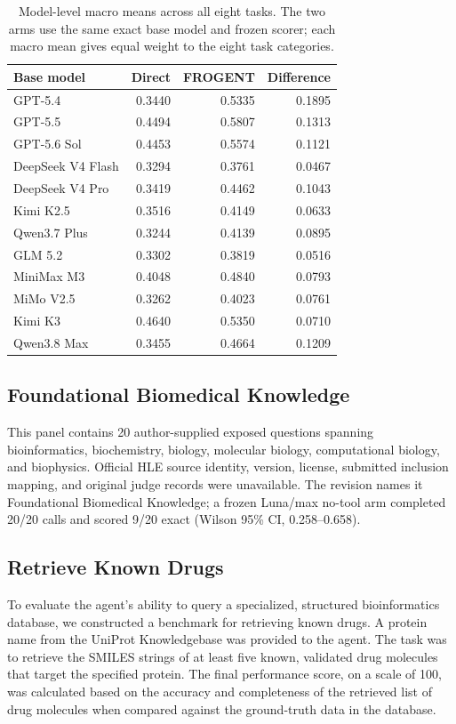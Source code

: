 \documentclass{article}
\begin{document}
\begin{table}[htbp]
\centering
\small
\caption{Model-level macro means across all eight tasks. The two arms use the same exact base model and frozen scorer; each macro mean gives equal weight to the eight task categories.}
\label{tab:sup-model-effects}
\begin{tabular}{lrrr}
\toprule
Base model & Direct & FROGENT & Difference \\
\midrule
GPT-5.4 & 0.3440 & 0.5335 & 0.1895 \\
GPT-5.5 & 0.4494 & 0.5807 & 0.1313 \\
GPT-5.6 Sol & 0.4453 & 0.5574 & 0.1121 \\
DeepSeek V4 Flash & 0.3294 & 0.3761 & 0.0467 \\
DeepSeek V4 Pro & 0.3419 & 0.4462 & 0.1043 \\
Kimi K2.5 & 0.3516 & 0.4149 & 0.0633 \\
Qwen3.7 Plus & 0.3244 & 0.4139 & 0.0895 \\
GLM 5.2 & 0.3302 & 0.3819 & 0.0516 \\
MiniMax M3 & 0.4048 & 0.4840 & 0.0793 \\
MiMo V2.5 & 0.3262 & 0.4023 & 0.0761 \\
Kimi K3 & 0.4640 & 0.5350 & 0.0710 \\
Qwen3.8 Max & 0.3455 & 0.4664 & 0.1209 \\
\bottomrule
\end{tabular}
\end{table}

\subsection{Foundational Biomedical Knowledge}

This panel contains 20 author-supplied exposed questions spanning bioinformatics, biochemistry, biology, molecular biology, computational biology, and biophysics. Official HLE source identity, version, license, submitted inclusion mapping, and original judge records were unavailable. The revision names it Foundational Biomedical Knowledge; a frozen Luna/max no-tool arm completed 20/20 calls and scored 9/20 exact (Wilson 95\% CI, 0.258--0.658).

\subsection{Retrieve Known Drugs}

To evaluate the agent's ability to query a specialized, structured bioinformatics database, we constructed a benchmark for retrieving known drugs. A protein name from the UniProt Knowledgebase was provided to the agent. The task was to retrieve the SMILES strings of at least five known, validated drug molecules that target the specified protein. The final performance score, on a scale of 100, was calculated based on the accuracy and completeness of the retrieved list of drug molecules when compared against the ground-truth data in the database.
\end{document}
